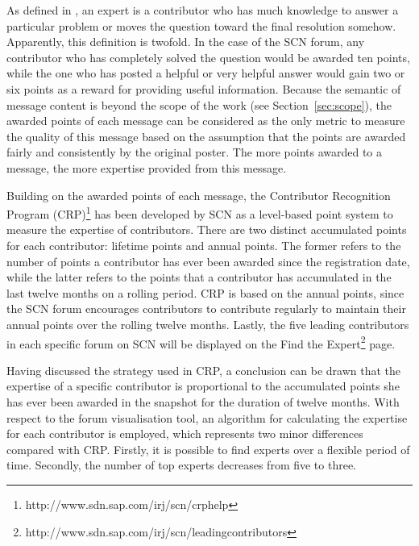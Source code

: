 As defined in \citep{Mcdonald2000}, an expert is a contributor who has much knowledge to answer a particular problem or moves the question toward the final resolution somehow. Apparently, this definition is twofold. In the case of the SCN forum, any contributor who has completely solved the question would be awarded ten points, while the one who has posted a helpful or very helpful answer would gain two or six points as a reward for providing useful information. Because the semantic of message content is beyond the scope of the work (see Section~\ref{sec:scope}), the awarded points of each message can be considered as the only metric to measure the quality of this message based on the assumption that the points are awarded fairly and consistently by the original poster. The more points awarded to a message, the more expertise provided from this message.

Building on the awarded points of each message, the Contributor Recognition Program (CRP)\footnote{http://www.sdn.sap.com/irj/scn/crphelp} has been developed by SCN as a level-based point system to measure the expertise of contributors. There are two distinct accumulated points for each contributor: lifetime points and annual points. The former refers to the number of points a contributor has ever been awarded since the registration date, while the latter refers to the points that a contributor has accumulated in the last twelve months on a rolling period. CRP is based on the annual points, since the SCN forum encourages contributors to contribute regularly to maintain their annual points over the rolling twelve months. Lastly, the five leading contributors in each specific forum on SCN will be displayed on the Find the Expert\footnote{http://www.sdn.sap.com/irj/scn/leadingcontributors} page.

Having discussed the strategy used in CRP, a conclusion can be drawn that the expertise of a specific contributor is proportional to the accumulated points she has ever been awarded in the snapshot for the duration of twelve months. With respect to the forum visualisation tool, an algorithm for calculating the expertise for each contributor is employed, which represents two minor differences compared with CRP. Firstly, it is possible to find experts over a flexible period of time. Secondly, the number of top experts decreases from five to three.

